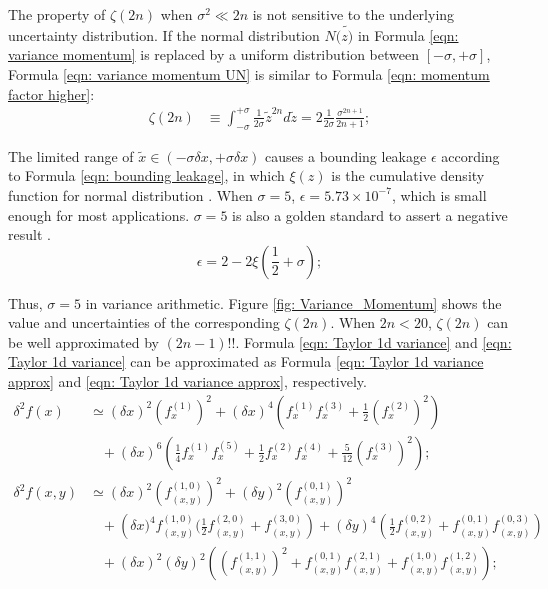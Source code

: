 \documentclass[twoside]{article}
\numberwithin{equation}{section}
\newcommand{\eqspace}{\;\;\;}
\begin{document}
The property of $\zeta(2n)$ when $\sigma^2 \ll 2n$ is not sensitive to the underlying uncertainty distribution.  If the normal distribution $N(\tilde{z)}$ in Formula \eqref{eqn: variance momentum} is replaced by a uniform distribution between $[-\sigma, +\sigma]$,  Formula \eqref{eqn: variance momentum UN} is similar to Formula \eqref{eqn: momentum factor higher}:
\begin{align}
\label{eqn: variance momentum UN}
\zeta(2n) &\equiv \int_{-\sigma}^{+\sigma} \frac{1}{2 \sigma} \tilde{z}^{2n} d \tilde{z} = 2 \frac{1}{2 \sigma} \frac{{\sigma}^{2n+1}}{2n + 1}; 
\end{align}

The limited range of $\tilde{x} \in (-\sigma \delta x, +\sigma \delta x)$ causes a bounding leakage $\epsilon$ according to Formula \eqref{eqn: bounding leakage}, in which $\xi(z)$ is the cumulative density function for normal distribution \cite{Probability_Statistics}.
When $\sigma = 5$, $\epsilon = 5.73 \times 10^{-7}$, which is small enough for most applications.
$\sigma = 5$ is also a golden standard to assert a negative result \cite{Precisions_Physical_Measurements}.
\begin{equation}
\label{eqn: bounding leakage}
\epsilon = 2 - 2 \xi(\frac{1}{2} + \sigma);
\end{equation}

Thus, $\sigma = 5$ in variance arithmetic.  
Figure \ref{fig: Variance_Momentum} shows the value and uncertainties of the corresponding $\zeta(2n)$.
When $2n < 20$, $\zeta(2n)$ can be well approximated by $(2n -1)!!$.  
Formula \eqref{eqn: Taylor 1d variance} and \eqref{eqn: Taylor 1d variance} can be approximated as Formula \eqref{eqn: Taylor 1d variance approx} and \eqref{eqn: Taylor 1d variance approx}, respectively.
\begin{align}
\label{eqn: Taylor 1d variance approx}
\delta^2 f(x) &\simeq (\delta x)^2 (f^{(1)}_x)^2 + (\delta x)^4 \left(f^{(1)}_x f^{(3)}_x + \frac{1}{2} (f^{(2)}_x)^2 \right) \\
  &\eqspace + (\delta x)^6 \left(\frac{1}{4} f^{(1)}_x f^{(5)}_x + \frac{1}{2} f^{(2)}_x f^{(4)}_x + \frac{5}{12} (f^{(3)}_x)^2 \right); \nonumber \\
\label{eqn: Taylor 2d variance approx}
\delta^2 f(x, y)&\simeq (\delta x)^2 (f^{(1,0)}_{(x,y)})^2 + (\delta y)^2 (f^{(0,1)}_{(x,y)})^2 \\
&\eqspace + \left(\delta x)^4 f^{(1,0)}_{(x,y)} (\frac{1}{2} f^{(2,0)}_{(x,y)} + f^{(3,0)}_{(x,y)}\right)
      + (\delta y)^4 \left(\frac{1}{2} f^{(0,2)}_{(x,y)} + f^{(0,1)}_{(x,y)} f^{(0,3)}_{(x,y)}\right) \nonumber \\
&\eqspace + (\delta x)^2 (\delta y)^2 \left((f^{(1,1)}_{(x,y)})^2 + f^{(0,1)}_{(x,y)} f^{(2,1)}_{(x,y)} + f^{(1,0)}_{(x,y)} f^{(1,2)}_{(x,y)}\right); \nonumber
\end{align}
\end{document}
